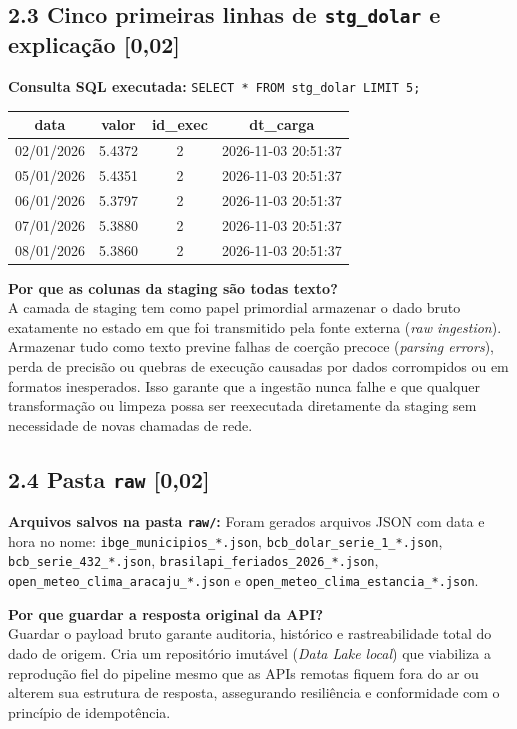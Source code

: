 \documentclass[11pt,a4paper]{article}
\begin{document}
\subsection*{2.3 Cinco primeiras linhas de \texttt{stg\_dolar} e explicação \textnormal{[0,02]}}

\noindent\textbf{Consulta SQL executada:} \texttt{SELECT * FROM stg\_dolar LIMIT 5;}

\begin{table}[h!]
\centering
\small
\begin{tabular}{cccc}
\toprule
\textbf{data} & \textbf{valor} & \textbf{id\_exec} & \textbf{dt\_carga} \\
\midrule
02/01/2026 & 5.4372 & 2 & 2026-11-03 20:51:37 \\
05/01/2026 & 5.4351 & 2 & 2026-11-03 20:51:37 \\
06/01/2026 & 5.3797 & 2 & 2026-11-03 20:51:37 \\
07/01/2026 & 5.3880 & 2 & 2026-11-03 20:51:37 \\
08/01/2026 & 5.3860 & 2 & 2026-11-03 20:51:37 \\
\bottomrule
\end{tabular}
\end{table}

\noindent\textbf{Por que as colunas da staging são todas texto?}\\
A camada de staging tem como papel primordial armazenar o dado bruto exatamente no estado em que foi transmitido pela fonte externa (\textit{raw ingestion}). Armazenar tudo como texto previne falhas de coerção precoce (\textit{parsing errors}), perda de precisão ou quebras de execução causadas por dados corrompidos ou em formatos inesperados. Isso garante que a ingestão nunca falhe e que qualquer transformação ou limpeza possa ser reexecutada diretamente da staging sem necessidade de novas chamadas de rede.

\subsection*{2.4 Pasta \texttt{raw} \textnormal{[0,02]}}
\noindent\textbf{Arquivos salvos na pasta \texttt{raw/}:}
Foram gerados arquivos JSON com data e hora no nome: \texttt{ibge\_municipios\_*.json}, \texttt{bcb\_dolar\_serie\_1\_*.json}, \texttt{bcb\_serie\_432\_*.json}, \texttt{brasilapi\_feriados\_2026\_*.json}, \texttt{open\_meteo\_clima\_aracaju\_*.json} e \texttt{open\_meteo\_clima\_estancia\_*.json}.

\vspace{0.2cm}
\noindent\textbf{Por que guardar a resposta original da API?}\\
Guardar o payload bruto garante auditoria, histórico e rastreabilidade total do dado de origem. Cria um repositório imutável (\textit{Data Lake local}) que viabiliza a reprodução fiel do pipeline mesmo que as APIs remotas fiquem fora do ar ou alterem sua estrutura de resposta, assegurando resiliência e conformidade com o princípio de idempotência.
\end{document}
